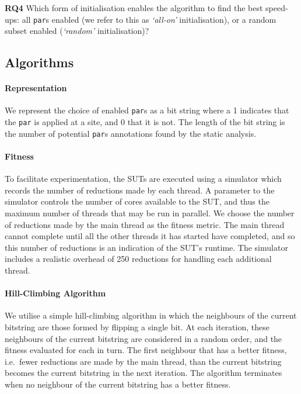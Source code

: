 \noindent\textbf{RQ4} Which form of initialisation enables the algorithm to find the best speed-ups: all \verb-par-s enabled (we refer to this as \emph{`all-on'} initialisation), or a random subset enabled (\emph{`random'} initialisation)?

\subsection{Algorithms}

\paragraph{Representation} We represent the choice of enabled \verb-par-s as a bit string where a 1 indicates that the \verb-par- is applied at a site, and 0 that it is not.  The length of the bit string is the number of potential \verb-par-s annotations found by the static analysis.

\paragraph{Fitness} To facilitate experimentation, the SUTs are executed using a simulator which records the number of reductions made by each thread.  A parameter to the simulator controls the number of cores available to the SUT, and thus the maximum number of threads that may be run in parallel.  We choose the number of reductions made by the main thread as the fitness metric. The main thread cannot complete until all the other threads it has started have completed, and so this number of reductions is an indication of the SUT's runtime.  The simulator includes a realistic overhead of 250 reductions for handling each additional thread.

\paragraph{Hill-Climbing Algorithm} We utilise a simple hill-climbing algorithm in which the neighbours of the current bitstring are those formed by flipping a single bit.  At each iteration, these neighbours of the current bitstring are considered in a random order, and the fitness evaluated for each in turn. The first neighbour that has a better fitness, i.e.~fewer reductions are made by the main thread, than the current bitstring becomes the current bitstring in the next iteration.  The algorithm terminates when no neighbour of the current bitstring has a better fitness.

